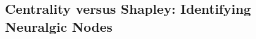 \documentclass[review,12pt]{elsarticle}
\begin{document}




\subsection{Centrality versus Shapley: Identifying Neuralgic Nodes}
\label{subsec:case_centrality_shapley}
\end{document}
